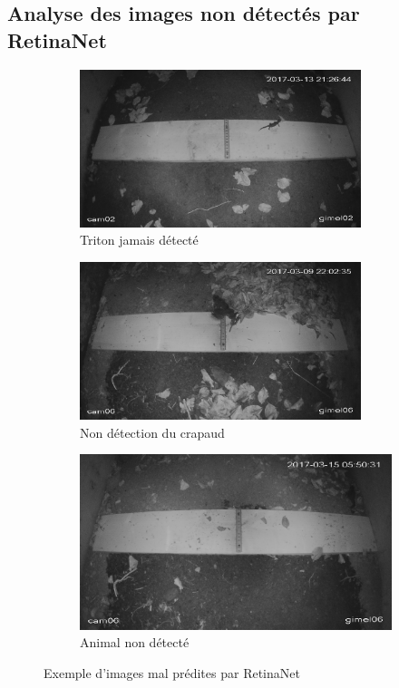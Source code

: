 \subsection{Analyse des images non détectés par RetinaNet}
\begin{figure}[ht]
    \centering
    \begin{subfigure}[h]{0.49\textwidth}
        \centering
        \includegraphics[width=0.9\textwidth]{images/failed_pred3_retina.png}
        \caption{Triton jamais détecté}
        \label{fig:eval_retina_a}
    \end{subfigure}
    \begin{subfigure}[h]{0.49\textwidth}
        \centering
        \includegraphics[width=0.9\textwidth]{images/failed_pred5_retina_big.png}
        \caption{Non détection du crapaud}
        \label{fig:eval_retina_b}
    \end{subfigure}
    \begin{subfigure}[h]{0.7\textwidth}
        \centering
        \includegraphics[width=0.9\linewidth]{images/failed_pred4_retina.png}
        \caption{Animal non détecté}
        \label{fig:eval_retina_c}
    \end{subfigure}
    \caption{Exemple d'images mal prédites par RetinaNet}
    \label{fig:failed_pred_retina}
\end{figure}
